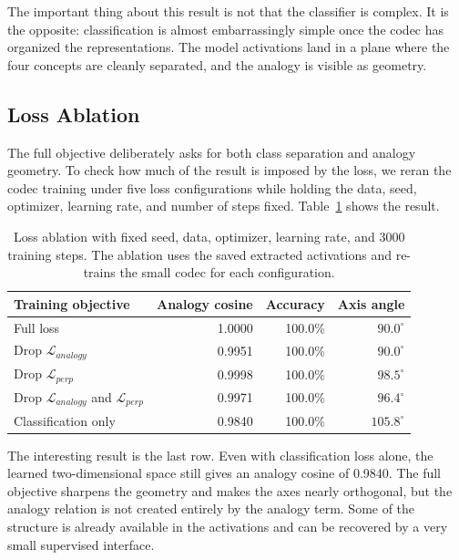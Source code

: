 \documentclass[11pt]{article}
\begin{document}
The important thing about this result is not that the classifier is complex. It
is the opposite: classification is almost embarrassingly simple once the codec
has organized the representations. The model activations land in a plane where
the four concepts are cleanly separated, and the analogy is visible as geometry.

\subsection{Loss Ablation}

The full objective deliberately asks for both class separation and analogy
geometry. To check how much of the result is imposed by the loss, we reran the
codec training under five loss configurations while holding the data, seed,
optimizer, learning rate, and number of steps fixed. Table~\ref{tab:loss-ablation}
shows the result.

\begin{table}[h]
\centering
\begin{tabular}{lrrr}
\toprule
Training objective & Analogy cosine & Accuracy & Axis angle \\
\midrule
Full loss & 1.0000 & 100.0\% & \(90.0^\circ\) \\
Drop \(\mathcal{L}_{analogy}\) & 0.9951 & 100.0\% & \(90.0^\circ\) \\
Drop \(\mathcal{L}_{perp}\) & 0.9998 & 100.0\% & \(98.5^\circ\) \\
Drop \(\mathcal{L}_{analogy}\) and \(\mathcal{L}_{perp}\) & 0.9971 & 100.0\% & \(96.4^\circ\) \\
Classification only & 0.9840 & 100.0\% & \(105.8^\circ\) \\
\bottomrule
\end{tabular}
\caption{Loss ablation with fixed seed, data, optimizer, learning rate, and
3000 training steps. The ablation uses the saved extracted activations and
re-trains the small codec for each configuration.}
\label{tab:loss-ablation}
\end{table}

The interesting result is the last row. Even with classification loss alone,
the learned two-dimensional space still gives an analogy cosine of 0.9840. The
full objective sharpens the geometry and makes the axes nearly orthogonal, but
the analogy relation is not created entirely by the analogy term. Some of the
structure is already available in the activations and can be recovered by a
very small supervised interface.
\end{document}
